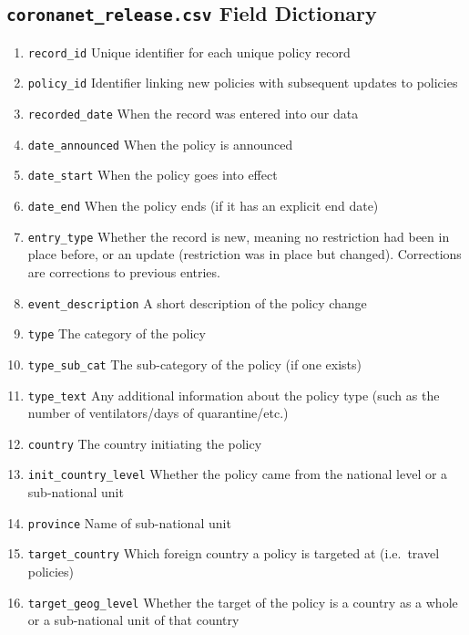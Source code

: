 \documentclass[
]{article}
\providecommand{\tightlist}{%
  \setlength{\itemsep}{0pt}\setlength{\parskip}{0pt}}
\begin{document}
\hypertarget{coronanet_release.csv-field-dictionary}{%
\subsection*{\texorpdfstring{\texttt{coronanet\_release.csv} Field Dictionary}{coronanet\_release.csv Field Dictionary}}\label{coronanet_release.csv-field-dictionary}}

\begin{enumerate}
\def\labelenumi{\arabic{enumi}.}
\tightlist
\item
  \texttt{record\_id} Unique identifier for each unique policy record
\item
  \texttt{policy\_id} Identifier linking new policies with subsequent updates to policies
\item
  \texttt{recorded\_date} When the record was entered into our data
\item
  \texttt{date\_announced} When the policy is announced
\item
  \texttt{date\_start} When the policy goes into effect
\item
  \texttt{date\_end} When the policy ends (if it has an explicit end date)
\item
  \texttt{entry\_type} Whether the record is new, meaning no restriction had been in place before, or an update (restriction was in place but changed). Corrections are corrections to previous entries.
\item
  \texttt{event\_description} A short description of the policy change
\item
  \texttt{type} The category of the policy
\item
  \texttt{type\_sub\_cat} The sub-category of the policy (if one exists)
\item
  \texttt{type\_text} Any additional information about the policy type (such as the number of ventilators/days of quarantine/etc.)
\item
  \texttt{country} The country initiating the policy
\item
  \texttt{init\_country\_level} Whether the policy came from the national level or a sub-national unit
\item
  \texttt{province} Name of sub-national unit
\item
  \texttt{target\_country} Which foreign country a policy is targeted at (i.e.~travel policies)
\item
  \texttt{target\_geog\_level} Whether the target of the policy is a country as a whole or a sub-national unit of that country

\end{enumerate}
\end{document}
